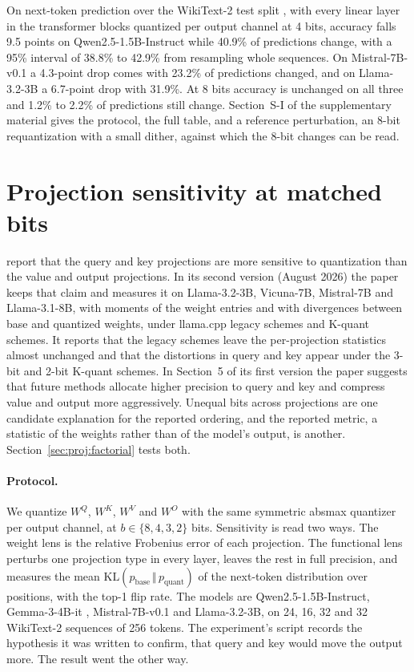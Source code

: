 \documentclass[journal]{IEEEtran}
\newcommand{\KL}{\mathrm{KL}}
\begin{document}
On next-token prediction over the WikiText-2 test split \citep{merity2017pointer}, with every
linear layer in the transformer blocks quantized per output channel at 4 bits, accuracy falls 9.5
points on Qwen2.5-1.5B-Instruct \citep{qwen2025qwen25} while 40.9\% of predictions change, with a
95\% interval of 38.8\% to 42.9\% from resampling whole sequences. On Mistral-7B-v0.1
\citep{jiang2023mistral} a 4.3-point drop comes with 23.2\% of predictions changed, and on
Llama-3.2-3B \citep{grattafiori2024llama3} a 6.7-point drop with 31.9\%. At 8 bits accuracy is
unchanged on all three and 1.2\% to 2.2\% of predictions still change. Section~S-I of the
supplementary material gives the protocol, the full table, and a reference perturbation, an 8-bit
requantization with a small dither, against which the 8-bit changes can be read.

\section{Projection sensitivity at matched bits}\label{sec:proj}

\citet{rababah2026illusion} report that the query and key projections are more sensitive to
quantization than the value and output projections. In its second version (August 2026) the
paper keeps that claim and measures it on Llama-3.2-3B, Vicuna-7B, Mistral-7B and Llama-3.1-8B,
with moments of the weight entries and with divergences between base and quantized weights,
under llama.cpp legacy schemes and K-quant schemes. It reports that the legacy schemes leave
the per-projection statistics almost unchanged and that the distortions in query and key appear
under the 3-bit and 2-bit K-quant schemes. In Section~5 of its first version the paper suggests that future methods allocate higher
precision to query and key and compress value and output more aggressively. Unequal bits across projections are one
candidate explanation for the reported ordering, and the reported metric, a statistic of the
weights rather than of the model's output, is another. Section~\ref{sec:proj:factorial} tests
both.

\paragraph{Protocol.} We quantize $W^Q$, $W^K$, $W^V$ and $W^O$ with the same symmetric absmax
quantizer per output channel, at $b \in \{8,4,3,2\}$ bits. Sensitivity is read two ways. The
weight lens is the relative Frobenius error of each projection. The functional lens perturbs
one projection type in every layer, leaves the rest in full precision, and measures the mean
$\KL(p_{\text{base}}\,\Vert\,p_{\text{quant}})$ of the next-token distribution over
positions, with the top-1 flip rate. The models are Qwen2.5-1.5B-Instruct, Gemma-3-4B-it
\citep{gemma2025gemma3}, Mistral-7B-v0.1 and Llama-3.2-3B, on 24, 16, 32 and 32 WikiText-2
sequences of 256 tokens. The experiment's script records the hypothesis it was written to
confirm, that query and key would move the output more. The result went the other way.
\end{document}
